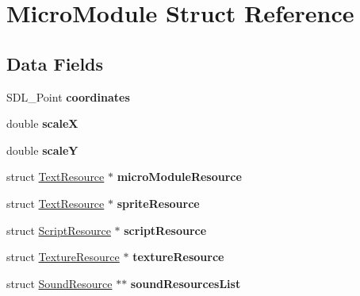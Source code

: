 \hypertarget{struct_micro_module}{}\section{Micro\+Module Struct Reference}
\label{struct_micro_module}
\subsection*{Data Fields}
\begin{DoxyCompactItemize}
\item 
\hypertarget{struct_micro_module_a667ad041f76f3b99c2ea65cd78b668ea}{}\label{struct_micro_module_a667ad041f76f3b99c2ea65cd78b668ea} 
S\+D\+L\+\_\+\+Point {\bfseries coordinates}
\item 
\hypertarget{struct_micro_module_af04d6c916584bdddd6a334359ff1059d}{}\label{struct_micro_module_af04d6c916584bdddd6a334359ff1059d} 
double {\bfseries scaleX}
\item 
\hypertarget{struct_micro_module_a936cc64e631dcd2b4ea124d5d8d4fe38}{}\label{struct_micro_module_a936cc64e631dcd2b4ea124d5d8d4fe38} 
double {\bfseries scaleY}
\item 
\hypertarget{struct_micro_module_a4d60b87bf57efb776c719cea270c6838}{}\label{struct_micro_module_a4d60b87bf57efb776c719cea270c6838} 
struct \hyperlink{struct_text_resource}{Text\+Resource} $\ast$ {\bfseries micro\+Module\+Resource}
\item 
\hypertarget{struct_micro_module_ac402150bd2243d7a6f04756f7b624fa1}{}\label{struct_micro_module_ac402150bd2243d7a6f04756f7b624fa1} 
struct \hyperlink{struct_text_resource}{Text\+Resource} $\ast$ {\bfseries sprite\+Resource}
\item 
\hypertarget{struct_micro_module_abc27117170d75eb9af11c98fd2d5d855}{}\label{struct_micro_module_abc27117170d75eb9af11c98fd2d5d855} 
struct \hyperlink{struct_script_resource}{Script\+Resource} $\ast$ {\bfseries script\+Resource}
\item 
\hypertarget{struct_micro_module_aedd0da0c072332f83e64105f8682bbdf}{}\label{struct_micro_module_aedd0da0c072332f83e64105f8682bbdf} 
struct \hyperlink{struct_texture_resource}{Texture\+Resource} $\ast$ {\bfseries texture\+Resource}
\item 
\hypertarget{struct_micro_module_a1eb76005d8836f5ffd80e3da1ca83988}{}\label{struct_micro_module_a1eb76005d8836f5ffd80e3da1ca83988} 
struct \hyperlink{struct_sound_resource}{Sound\+Resource} $\ast$$\ast$ {\bfseries sound\+Resources\+List}
\item 
$$
\end{DoxyCompactItemize}
